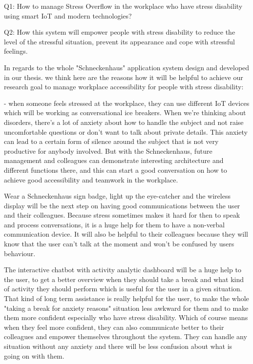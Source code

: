 Q1: How to manage Stress Overflow in the workplace who have stress disability using smart \ac{IoT} and modern technologies?

Q2: How this system will empower people with stress disability to reduce the level of the stressful situation, prevent its appearance and cope with stressful feelings.

In regards to the whole "Schneckenhaus" application system design and developed in our thesis. we think here are the reasons how it will be helpful to achieve our research goal to manage workplace accessibility for people with stress disability:

- when someone feels stressed at the workplace, they can use different IoT devices which will be working as conversational ice breakers. When we're thinking about disorders, there's a lot of anxiety about how to handle the subject and not raise uncomfortable questions or don't want to talk about private details. This anxiety can lead to a certain form of silence around the subject that is not very productive for anybody involved. But with the Schneckenhaus, future management and colleagues can demonstrate interesting architecture and different functions there, and this can start a good conversation on how to achieve good accessibility and teamwork in the workplace.

Wear a Schneckenhaus sign badge, light up the eye-catcher and the wireless display will be the next step on having good communications between the user and their colleagues. Because stress sometimes makes it hard for then to speak and process conversations, it is a huge help for them to have a non-verbal communication device. It will also be helpful to their colleagues because they will know that the user can't talk at the moment and won't be confused by users behaviour.

The interactive chatbot with activity analytic dashboard will be a huge help to the user, to get a better overview when they should take a break and what kind of activity they should perform which is useful for the user in a given situation. That kind of long term assistance is really helpful for the user, to make the whole "taking a break for anxiety reasons" situation less awkward for them and to make them more confident especially who have stress disability. Which of course means when they feel more confident, they can also communicate better to their colleagues and empower themselves throughout the system. They can handle any situation without any anxiety and there will be less confusion about what is going on with them.

